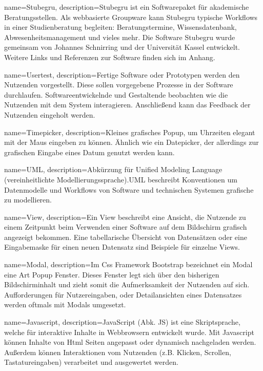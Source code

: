 \makeglossaries



{
    name=Stubegru,
    description={Stubegru ist ein Softwarepaket für akademische Beratungsstellen. Als webbasierte Groupware kann Stubegru typische Workflows in einer Studienberatung begleiten: Beratungstermine, Wissensdatenbank, Abwesenheitsmanagement und vieles mehr\cite{stubegruWebsite}. Die Software Stubegru wurde gemeinsam von Johannes Schnirring und der Universität Kassel entwickelt. Weitere Links und Referenzen zur Software finden sich im Anhang.}
}

{
    name=Usertest,
    description={Fertige Software oder Prototypen werden den Nutzenden vorgestellt. Diese sollen vorgegebene Prozesse in der Software durchlaufen. Softwareentwickelnde und Gestaltende beobachten wie die Nutzenden mit dem System interagieren. Anschließend kann das Feedback der Nutzenden eingeholt werden.}
}

{
    name=Timepicker,
    description={Kleines grafisches Popup, um Uhrzeiten elegant mit der Maus eingeben zu können. Ähnlich wie ein Datepicker, der allerdings zur grafischen Eingabe eines Datum genutzt werden kann. \cite{datepicker}}
}

{
    name=UML,
    description={Abkürzung für Unified Modeling Language (vereinheitlichte Modellierungssprache).UML beschreibt Konventionen um Datenmodelle und Workflows von Software und technischen Systemen grafische zu modellieren.\cite{UML}}
}

{
    name=View,
    description={Ein View beschreibt eine Ansicht, die Nutzende zu einem Zeitpunkt beim Verwenden einer Software auf dem Bildschirm grafisch angezeigt bekommen. Eine tabellarische Übersicht von Datensätzen oder eine Eingabemaske für einen neuen Datensatz sind Beispiele für einzelne Views.}
}

{
    name=Modal,
    description={Im \gls{Css} Framework \gls{Bootstrap} bezeichnet ein Modal eine Art Popup Fenster. Dieses Fenster legt sich über den bisherigen Bildschirminhalt und zieht somit die Aufmerksamkeit der Nutzenden auf sich. Aufforderungen für Nutzereingaben, oder Detailansichten eines Datensatzes werden oftmals mit Modals umgesetzt.}
}

{
    name=Javascript,
    description={JavaScript (Abk. JS) ist eine Skriptsprache, welche für interaktive Inhalte in Webbrowsern entwickelt wurde. Mit Javascript können Inhalte von \gls{Html} Seiten angepasst oder dynamisch nachgeladen werden. Außerdem können Interaktionen vom Nutzenden (z.B. Klicken, Scrollen, Tastatureingaben) verarbeitet und ausgewertet werden.\cite{Javascript}}
}

